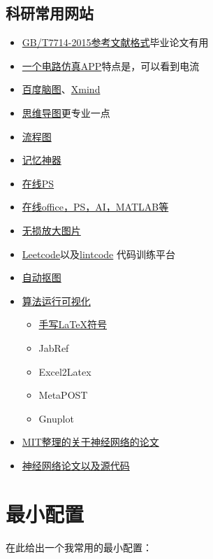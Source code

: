 \documentclass[UTF8,oneside]{ctexbook}
\begin{document}
\subsection{科研常用网站}
\begin{itemize}
	\item \href{http://www.latexstudio.net/archives/6888.html}{GB/T7714-2015参考文献格式}毕业论文有用
	\item \href{https://www.52pojie.cn/thread-716675-1-1.html}{一个电路仿真APP}特点是，可以看到电流
	\item \href{http://naotu.baidu.com/file/97d9cd5ca30672903a3e3321e62c6ed8}{百度脑图}、\href{https://github.com/lonelybag/pwc}{Xmind}
	\item \href{https://mm.edrawsoft.cn/map.html?obj=wxoa3v5wBLcpmgCifx59_Uzk5X4qHU/Personal/未命名文件.emmx}{思维导图}更专业一点
	\item \href{https://www.processon.com/login;jsessionid=022BCDCA031DD3C240BE7FD87D942F03.jvm1?backUrl=/diagraming/5be7a513e4b0d74dc539976e}{流程图}
	\item \href{https://ankiweb.net/shared/decks/}{记忆神器}
	\item \href{https://www.photopea.com}{在线PS}
	\item \href{https://uzer.me/u/signin}{在线office，PS，AI，MATLAB等}
	\item \href{https://bigjpg.com}{无损放大图片}
	\item \href{https://leetcode.com}{Leetcode}以及\href{https://www.lintcode.com/zh-cn/accounts/signup/}{lintcode} 代码训练平台
	\item \href{https://www.remove.bg}{自动抠图}
	\item \href{https://algorithm-visualizer.org}{算法运行可视化}
	      \begin{itemize}
		      \item \href{http://detexify.kirelabs.org/classify.html}{手写LaTeX符号}
		      \item JabRef
		      \item Excel2Latex
		      \item MetaPOST
		      \item Gnuplot
	      \end{itemize}
	\item \href{https://www.stateoftheart.ai}{MIT整理的关于神经网络的论文}
	\item \href{https://github.com/lonelybag/pwc}{神经网络论文以及源代码}
\end{itemize}


\section{最小配置}
在此给出一个我常用的最小配置：
\end{document}
